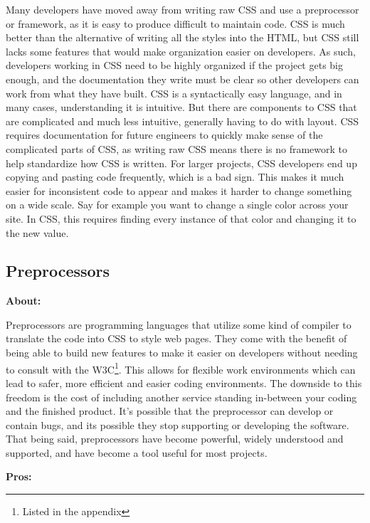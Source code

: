 \documentclass[draftclsnofoot,onecolumn,letterpaper,10pt,compsoc]{IEEEtran}
\begin{document}
    Many developers have moved away from writing raw CSS and use a preprocessor or framework, as it is easy to produce difficult to maintain code.
    CSS is much better than the alternative of writing all the styles into the HTML, but CSS still lacks some features that would make organization easier on developers.
    As such, developers working in CSS need to be highly organized if the project gets big enough, and the documentation they write must be clear so other developers can work from what they have built.
    CSS is a syntactically easy language, and in many cases, understanding it is intuitive.
    But there are components to CSS that are complicated and much less intuitive, generally having to do with layout.\cite{CSSProCon}
    CSS requires documentation for future engineers to quickly make sense of the complicated parts of CSS, as writing raw CSS means there is no framework to help standardize how CSS is written.
    For larger projects, CSS developers end up copying and pasting code frequently, which is a bad sign.
    This makes it much easier for inconsistent code to appear and makes it harder to change something on a wide scale.
    Say for example you want to change a single color across your site.
    In CSS, this requires finding every instance of that color and changing it to the new value.

  \subsection{Preprocessors}
    \textbf{About:}

    Preprocessors are programming languages that utilize some kind of compiler to translate the code into CSS to style web pages.
    They come with the benefit of being able to build new features to make it easier on developers without needing to consult with the W3C\footnote{Listed in the appendix}.
    This allows for flexible work environments which can lead to safer, more efficient and easier coding environments.
    The downside to this freedom is the cost of including another service standing in-between your coding and the finished product.
    It's possible that the preprocessor can develop or contain bugs, and its possible they stop supporting or developing the software.
    That being said, preprocessors have become powerful, widely understood and supported, and have become a tool useful for most projects.

    \noindent \textbf{Pros:}
\end{document}
